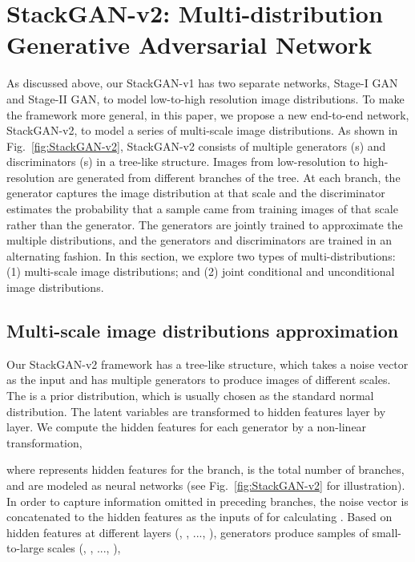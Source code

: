 \documentclass[10pt,journal,letterpaper,compsoc]{IEEEtran}
\begin{document}
\section{StackGAN-v2: Multi-distribution Generative Adversarial Network} \label{sec:v2}

As discussed above, our StackGAN-v1 has two separate networks, Stage-I GAN and Stage-II GAN, to model low-to-high resolution image distributions. To make the framework more general, in this paper, we propose a new end-to-end network, StackGAN-v2, to model a series of multi-scale image distributions. As shown in Fig.~\ref{fig:StackGAN-v2}, StackGAN-v2 consists of multiple generators (s) and discriminators (s) in a tree-like structure. Images from low-resolution to high-resolution are generated from different branches of the tree. At each branch, the generator captures the image distribution at that scale and the discriminator estimates the probability that a sample came from training images of that scale rather than the generator. The generators are jointly trained to approximate the multiple distributions, and the generators and discriminators are trained in an alternating fashion. In this section, we explore two types of multi-distributions: (1) multi-scale image distributions; and (2) joint conditional and unconditional image distributions. 


\subsection{Multi-scale image distributions approximation} \label{sec:jcu}

Our StackGAN-v2 framework has a tree-like structure, which takes a noise vector  as the input and has multiple generators to produce images of different scales. The  is a prior distribution, which is usually chosen as the standard normal distribution.  The latent variables  are transformed to hidden features layer by layer. We compute the hidden features  for each generator  by a non-linear transformation,
 
where  represents hidden features for the  branch,  is the total number of branches, and  are modeled as neural networks (see Fig.~\ref{fig:StackGAN-v2} for illustration). In order to capture information omitted in preceding branches, the noise vector  is concatenated to the hidden features  as the inputs of  for calculating . Based on hidden features at different layers (, , ..., ), generators produce samples of small-to-large scales (, , ..., ),
\end{document}
